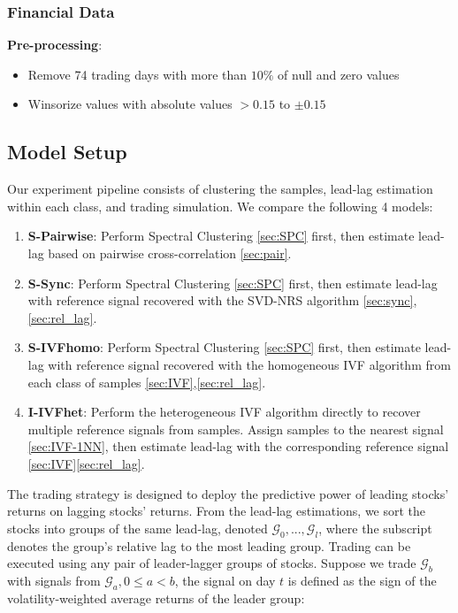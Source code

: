 \documentclass[sigconf]{acmart}
\begin{document}
\subsubsection{Financial Data}
\textbf{Pre-processing}:
\begin{itemize}
    \item Remove 74 trading days with more than $10\%$ of null and zero values
    \item Winsorize values with absolute values $>0.15$ to $\pm0.15$
\end{itemize}
\subsection{Model Setup}
Our experiment pipeline consists of clustering the samples, lead-lag estimation within each class, and trading simulation. We compare the following 4 models:
\begin{enumerate}
    \item \textbf{S-Pairwise}: Perform Spectral Clustering \ref{sec:SPC} first, then estimate lead-lag based on pairwise cross-correlation \ref{sec:pair}.
    
    \item \textbf{S-Sync}: Perform Spectral Clustering \ref{sec:SPC} first, then estimate lead-lag with reference signal recovered with the SVD-NRS algorithm \ref{sec:sync},\ref{sec:rel_lag}.
    
    \item \textbf{S-IVFhomo}: Perform Spectral Clustering \ref{sec:SPC} first, then estimate lead-lag with reference signal recovered with the homogeneous IVF algorithm from each class of samples \ref{sec:IVF},\ref{sec:rel_lag}.
    
    \item \textbf{I-IVFhet}: Perform the heterogeneous IVF algorithm directly to recover multiple reference signals from samples. Assign samples to the nearest signal \ref{sec:IVF-1NN}, then estimate lead-lag with the corresponding reference signal \ref{sec:IVF}\ref{sec:rel_lag}.
\end{enumerate}
The trading strategy is designed to deploy the predictive power of leading stocks' returns on lagging stocks' returns. From the lead-lag estimations, we sort the stocks into groups of the same lead-lag, denoted $\mathcal{G}_0,..., \mathcal{G}_l$, where the subscript denotes the group's relative lag to the most leading group. Trading can be executed using any pair of leader-lagger groups of stocks. Suppose we trade $\mathcal{G}_b$ with signals from $\mathcal{G}_a, 0\leq a<b$, the signal on day $t$ is defined as the sign of the volatility-weighted average returns of the leader group:
\end{document}
